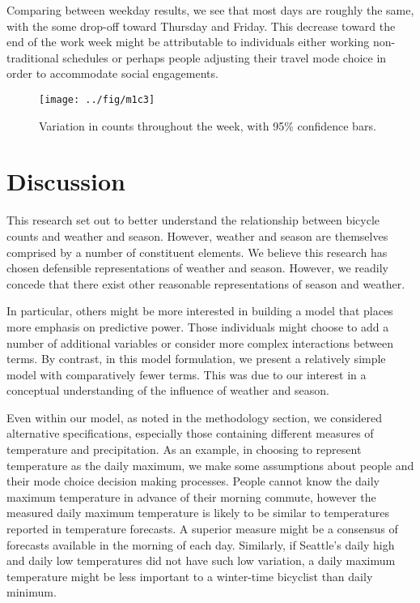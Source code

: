 \documentclass[12pt,letterpaper,article,twocolumn]{memoir}
\begin{document}
Comparing between weekday results, we see that most days are roughly
the same, with the some drop-off toward Thursday and Friday. This
decrease toward the end of the work week might be attributable to
individuals either working non-traditional schedules or perhaps people
adjusting their travel mode choice in order to accommodate social
engagements.

\begin{figure}[ht!]
  \centering
  \texttt{[image: ../fig/m1c3]}
  \caption{Variation in counts throughout the week, with 95\% confidence bars.}
  \label{fg:dayofweek}
\end{figure}

\FloatBarrier
\section*{Discussion}
This research set out to better understand the relationship between
bicycle counts and weather and season. However, weather and season are
themselves comprised by a number of constituent elements. We believe
this research has chosen defensible representations of weather and
season. However, we readily concede that there exist other reasonable
representations of season and weather.

In particular, others might be more interested in building a model
that places more emphasis on predictive power. Those individuals might
choose to add a number of additional variables or consider more
complex interactions between terms. By contrast, in this model
formulation, we present a relatively simple model with comparatively
fewer terms. This was due to our interest in a conceptual
understanding of the influence of weather and season.

Even within our model, as noted in the methodology section, we
considered alternative specifications, especially those containing
different measures of temperature and precipitation. As an example, in
choosing to represent temperature as the daily maximum, we make some
assumptions about people and their mode choice decision making
processes. People cannot know the daily maximum temperature in advance
of their morning commute, however the measured daily maximum
temperature is likely to be similar to temperatures reported in
temperature forecasts. A superior measure might be a consensus of
forecasts available in the morning of each day. Similarly, if
Seattle's daily high and daily low temperatures did not have such low
variation, a daily maximum temperature might be less important to a
winter-time bicyclist than daily minimum.
\end{document}
